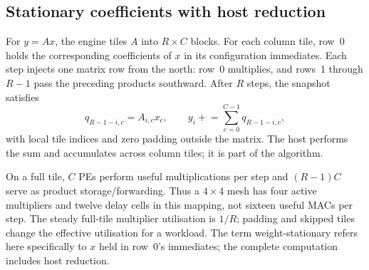 \subsection{Stationary coefficients with host reduction}

For $y=Ax$, the engine tiles $A$ into $R\times C$ blocks. For each column tile,
row~0 holds the corresponding coefficients of $x$ in its configuration
immediates. Each step injects one matrix row from the north: row~0 multiplies,
and rows~1 through $R-1$ pass the preceding products southward.
After $R$ steps, the snapshot satisfies
\begin{equation}
  q_{R-1-i,c}=A_{i,c}x_c,\qquad
  y_i\mathrel{+}=\sum_{c=0}^{C-1}q_{R-1-i,c},
\end{equation}
with local tile indices and zero padding outside the matrix. The host performs
the sum and accumulates across column tiles; it is part of the algorithm.



On a full tile, $C$ PEs perform useful multiplications per step and
$(R-1)C$ serve as product storage/forwarding. Thus a $4\times4$ mesh has four
active multipliers and twelve delay cells in this mapping, not sixteen useful
MACs per step. The steady full-tile multiplier utilisation is $1/R$;
padding and skipped tiles change the effective utilisation for a workload.
The term weight-stationary refers here specifically to $x$ held in row~0's
immediates; the complete computation includes host reduction.
